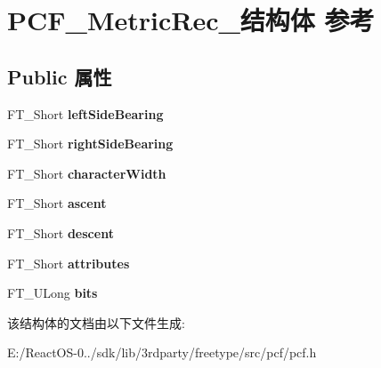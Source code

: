 \hypertarget{struct_p_c_f___metric_rec__}{}\section{P\+C\+F\+\_\+\+Metric\+Rec\+\_\+结构体 参考}
\label{struct_p_c_f___metric_rec__}
\subsection*{Public 属性}
\begin{DoxyCompactItemize}
\item 
\mbox{\label{struct_p_c_f___metric_rec___a2aad06aa95e7ed8224e798568a8c67b4}} 
F\+T\+\_\+\+Short {\bfseries left\+Side\+Bearing}
\item 
\mbox{\label{struct_p_c_f___metric_rec___a9467aee2a6fde65f71b2748ac4ac634d}} 
F\+T\+\_\+\+Short {\bfseries right\+Side\+Bearing}
\item 
\mbox{\label{struct_p_c_f___metric_rec___a121fbf02ee1dae3753b4f32af097eb9c}} 
F\+T\+\_\+\+Short {\bfseries character\+Width}
\item 
\mbox{\label{struct_p_c_f___metric_rec___a577fb99014992e7745a7aabc089afe30}} 
F\+T\+\_\+\+Short {\bfseries ascent}
\item 
\mbox{\label{struct_p_c_f___metric_rec___aa0e788e33d353f08320d33a1c6d4b697}} 
F\+T\+\_\+\+Short {\bfseries descent}
\item 
\mbox{\label{struct_p_c_f___metric_rec___a04beeeaff10a6892d115ef188a687745}} 
F\+T\+\_\+\+Short {\bfseries attributes}
\item 
\mbox{\label{struct_p_c_f___metric_rec___af154186a935817fa06101885e74fd266}} 
F\+T\+\_\+\+U\+Long {\bfseries bits}
\end{DoxyCompactItemize}


该结构体的文档由以下文件生成\+:\begin{DoxyCompactItemize}
\item 
E\+:/\+React\+O\+S-\/0../sdk/lib/3rdparty/freetype/src/pcf/pcf.\+h\end{DoxyCompactItemize}
